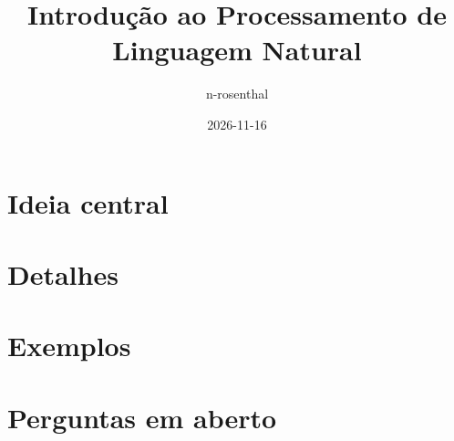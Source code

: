 \documentclass[11pt,a4paper]{scrartcl}
\author{n-rosenthal}
\date{2026-11-16}
\title{Introdução ao Processamento de Linguagem Natural}
\begin{document}
\maketitle
\tableofcontents

\section{Ideia central}
\label{sec:org60f3d22}

\section{Detalhes}
\label{sec:orgc5c654d}

\section{Exemplos}
\label{sec:orgb3e438b}

\section{Perguntas em aberto}
\label{sec:org9d324de}
\end{document}
